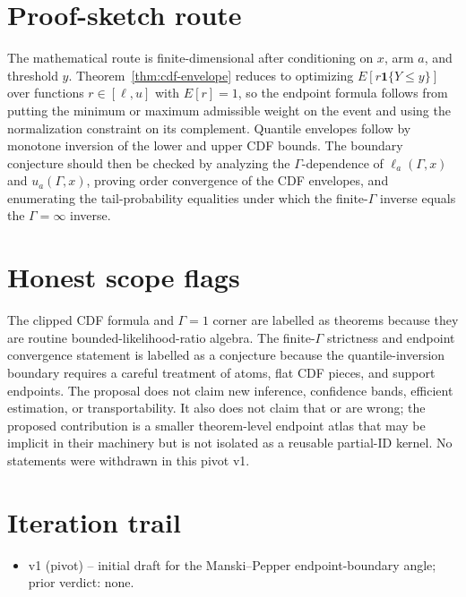 \documentclass[11pt]{article}
\newcommand{\one}{\mathbf{1}}
\theoremstyle{definition}
\theoremstyle{plain}
\theoremstyle{remark}
\begin{document}
\section{Proof-sketch route}
The mathematical route is finite-dimensional after conditioning on \(x\), arm \(a\), and threshold \(y\).  Theorem~\ref{thm:cdf-envelope} reduces to optimizing \(E[r\one\{Y\le y\}]\) over functions \(r\in[\ell,u]\) with \(E[r]=1\), so the endpoint formula follows from putting the minimum or maximum admissible weight on the event and using the normalization constraint on its complement.  Quantile envelopes follow by monotone inversion of the lower and upper CDF bounds.  The boundary conjecture should then be checked by analyzing the \(\Gamma\)-dependence of \(\ell_a(\Gamma,x)\) and \(u_a(\Gamma,x)\), proving order convergence of the CDF envelopes, and enumerating the tail-probability equalities under which the finite-\(\Gamma\) inverse equals the \(\Gamma=\infty\) inverse.

\section{Honest scope flags}
The clipped CDF formula and \(\Gamma=1\) corner are labelled as theorems because they are routine bounded-likelihood-ratio algebra.  The finite-\(\Gamma\) strictness and endpoint convergence statement is labelled as a conjecture because the quantile-inversion boundary requires a careful treatment of atoms, flat CDF pieces, and support endpoints.  The proposal does not claim new inference, confidence bands, efficient estimation, or transportability.  It also does not claim that \citet{MastenPoirierRen2025} or \citet{Wang2026} are wrong; the proposed contribution is a smaller theorem-level endpoint atlas that may be implicit in their machinery but is not isolated as a reusable partial-ID kernel.  No statements were withdrawn in this pivot v1.

\section{Iteration trail}
\begin{itemize}[leftmargin=*]
\item v1 (pivot) -- initial draft for the Manski--Pepper endpoint-boundary angle; prior verdict: none.
\end{itemize}
\end{document}
